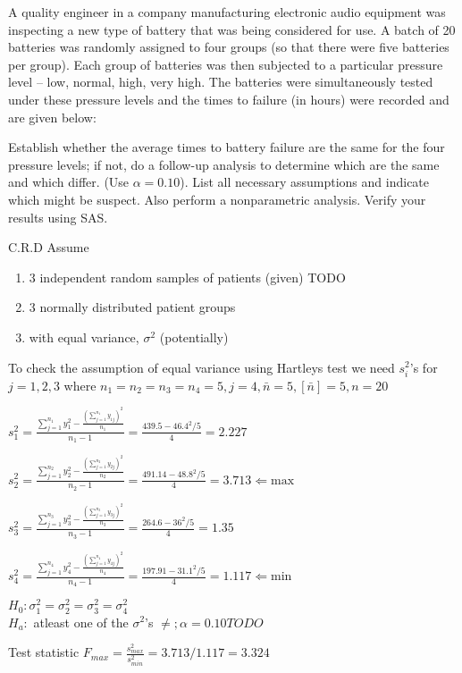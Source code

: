 \documentclass{article}
\begin{document}
A quality engineer in a company manufacturing electronic audio equipment was inspecting
 a new type of battery that was being considered for use. A batch of 20 batteries was
 randomly assigned to four groups (so that there were five batteries per group). Each group
 of batteries was then subjected to a particular pressure level – low, normal, high, very
 high. The batteries were simultaneously tested under these pressure levels and the times
 to failure (in hours) were recorded and are given below: 

Establish whether the average times to battery failure are the same for the four pressure levels;
if not, do a follow-up analysis to determine which are the same and which differ. (Use $\alpha =0.10$).
List all necessary assumptions and indicate which might be suspect. Also perform a nonparametric analysis. Verify your results using SAS. 

C.R.D
Assume 
\begin{enumerate}[1)]
\item 3 independent random samples of patients (given) TODO
\item 3 normally distributed patient groups
\item with equal variance, $\sigma^2$ (potentially)
\end{enumerate}

To check the assumption of equal variance using Hartleys test we need $s_i^2$'s for $j = 1,2,3$ where $n_1 = n_2 = n_3 = n_4 = 5, j = 4, \bar{n} = 5, [\bar{n}] = 5, n = 20$

$s_1^2 = \frac{
\sum_{j=1}^{n_1} {y_1^2} - \frac{ (\sum_{j=1}^{n_1}{y_{1j}})^2}{n_1}
}{
n_1 - 1
}
=
\frac{
439.5 - 46.4^2 / 5
}{4}
= 2.227
$


$s_2^2 = \frac{
\sum_{j=1}^{n_2} {y_2^2} - \frac{ (\sum_{j=1}^{n_2}{y_{2j}})^2}{n_2}
}{
n_2 - 1
}
=
\frac{
491.14 - 48.8^2 / 5
}{4}
= 3.713 \Leftarrow \text{max}
$

$s_3^2 = \frac{
\sum_{j=1}^{n_3} {y_3^2} - \frac{ (\sum_{j=1}^{n_3}{y_{3j}})^2}{n_3}
}{
n_3 - 1
}
=
\frac{
264.6 - 36^2 / 5
}{4}
= 1.35
$


$s_4^2 = \frac{
\sum_{j=1}^{n_4} {y_4^2} - \frac{ (\sum_{j=1}^{n_4}{y_{4j}})^2}{n_4}
}{
n_4 - 1
}
=
\frac{
197.91 - 31.1^2 / 5
}{4}
= 1.117 \Leftarrow \text{min}
$


$H_0: \sigma_1^2 = \sigma_2^2 = \sigma_3^2 = \sigma_4^2$ \\
$H_a:$ atleast one of the $\sigma^2$'s $\neq; \alpha = 0.10 TODO$

Test statistic $F_{max} = \frac{s_{max}^2}{s_{min}^2} = 3.713 / 1.117 = 3.324$
\end{document}
